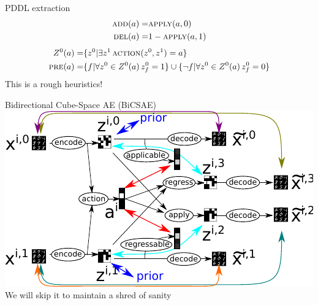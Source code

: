 \documentclass{lecture}
\newcommand{\function}[1]{\textsc{#1}}
\begin{document}
\begin{frame}{PDDL extraction}
    \begin{align*}
        \function{add}(a) = & \function{apply}(a, 0) \\
        \function{del}(a) = & 1-\function{apply}(a, 1) \\
    \end{align*}    
    \pause
    \begin{align*}        
        Z^0(a) = & \{z^0 | \exists z^1\, \function{action}(z^0, z^1)=a \} \\
        \function{pre}(a) = & \{f | \forall z^0\in Z^0(a)\, z_f^0=1\} \cup \{\lnot f |\forall z^0\in Z^0(a)\, z_f^0=0\} \\        
    \end{align*}
    \pause
    \alert{This is a rough heuristics!}
\end{frame}

\begin{frame}{Bidirectional Cube-Space AE (BiCSAE)}
    \includegraphics[width=\textwidth]{img___latplan___ama4.pdf}
    \alert{We will skip it to maintain a shred of sanity}
\end{frame}
\end{document}
